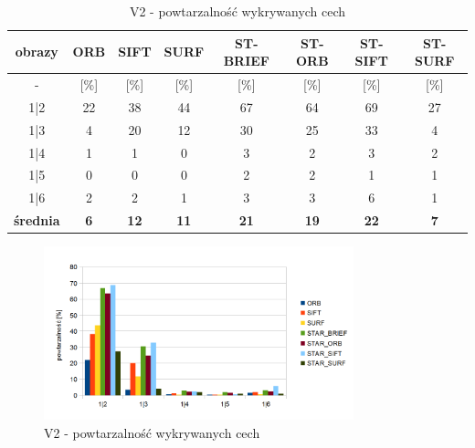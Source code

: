 \begin{table}[htbp]
  \centering
  \caption{V2 - powtarzalność wykrywanych cech}
    \begin{tabular}{|c|c|c|c|c|c|c|c|}\hline

    obrazy & \textbf{ORB} & \textbf{SIFT} & \textbf{SURF} & \textbf{ST-BRIEF} & \textbf{ST-ORB} & \textbf{ST-SIFT} & \textbf{ST-SURF} \\\hline

    -  & [\%] & [\%] & [\%] & [\%] & [\%] & [\%] & [\%] \\\hline
    1|2 & 22 & 38 & 44 & 67 & 64 & 69 & 27 \\
    1|3 & 4 & 20 & 12 & 30 & 25 & 33 & 4 \\
    1|4 & 1 & 1 & 0 & 3 & 2 & 3 & 2 \\
    1|5 & 0 & 0 & 0 & 2 & 2 & 1 & 1 \\
    1|6 & 2 & 2 & 1 & 3 & 3 & 6 & 1 \\\hline
    \textbf{średnia} & \textbf{6} & \textbf{12} & \textbf{11} & \textbf{21} & \textbf{19} & \textbf{22} & \textbf{7} \\\hline
    

    \end{tabular}%
  \label{tab:v2_m1}%
\end{table}%


\begin{figure}
\centering
\includegraphics[width=0.8\textwidth]{pict/slowik/v2/m1.png}
\caption{V2 - powtarzalność wykrywanych cech}
\label{fig:v2_m1}
\end{figure}

